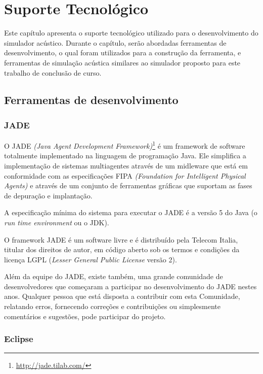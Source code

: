 \chapter{Suporte Tecnológico}

Este capítulo apresenta o suporte tecnológico utilizado para o desenvolvimento do simulador acústico. Durante o capítulo, serão abordadas ferramentas de desenvolvimento, o qual foram utilizados para a construção da ferramenta, e ferramentas de simulação acústica similares ao simulador proposto para este trabalho de conclusão de curso.

\section{Ferramentas de desenvolvimento}

\subsection{JADE}

O JADE \textit{(Java Agent Development Framework)}\footnote{\url{http://jade.tilab.com/}} é um framework de software totalmente implementado na linguagem de programação Java. Ele simplifica a implementação de sistemas multiagentes através de um midleware que está em conformidade com as especificações FIPA \textit{(Foundation for Intelligent Physical Agents)} e através de um conjunto de ferramentas gráficas que suportam as fases de depuração e implantação. 

A especificação mínima do sistema para executar o JADE é a versão 5 do Java (o \textit{run time environment} ou o JDK).

O framework JADE é um software livre e é distribuído pela Telecom Italia, titular dos direitos de autor, em código aberto sob os termos e condições da licença LGPL (\textit{Lesser General Public License} versão 2). 

Além da equipe do JADE, existe também, uma grande comunidade de desenvolvedores que começaram a participar no desenvolvimento do JADE nestes anos. Qualquer pessoa que está disposta a contribuir com esta Comunidade, relatando erros, fornecendo correções e contribuições ou simplesmente comentários e sugestões, pode participar do projeto.

\subsection{Eclipse}\label{Eclipse}

